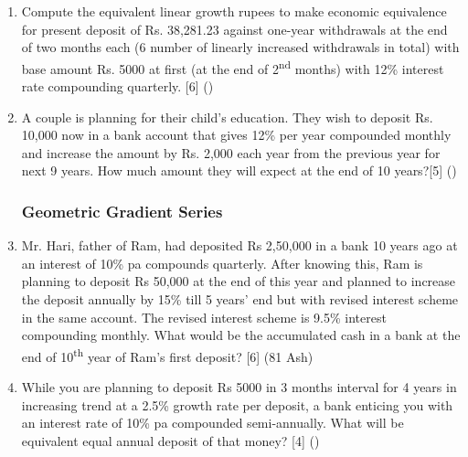 \documentclass[12pt]{article}
\newcommand{\super}[1]{\textsuperscript{#1}}
\begin{document}
\begin{enumerate}[noitemsep, topsep=0pt]
			\item Compute the equivalent linear growth rupees to make economic equivalence for present deposit of Rs. 38,281.23 against one-year withdrawals at the end of two months each (6 number of linearly increased withdrawals in total) with base amount Rs. 5000 at first (at the end of 2\textsuperscript{nd} months) with 12\% interest rate compounding quarterly. \hfill[6] ()

			\item A couple is planning for their child's education. They wish to deposit Rs. 10,000 now in a bank account that gives 12\% per year compounded monthly and increase the amount by Rs. 2,000 each year from the previous year for next 9 years. How much amount they will expect at the end of 10 years?\hfill[5] ()
	
		\subsubsection{Geometric Gradient Series}
		
			\item Mr. Hari, father of Ram, had deposited Rs 2,50,000 in a bank 10 years ago at an interest of 10\% pa compounds quarterly. After knowing this, Ram is planning to deposit Rs 50,000 at the end of this year and planned to increase the deposit annually by 15\% till 5 years' end but with revised interest scheme in the same account. The revised interest scheme is 9.5\% interest compounding monthly. What would be the accumulated cash in a bank at the end of 10\super{th} year of Ram's first deposit? \hfill[6] (81 Ash)

			\item While you are planning to deposit Rs 5000 in 3 months interval for 4 years in increasing trend at a 2.5\% growth rate per deposit, a bank enticing you with an interest rate of 10\% pa compounded semi-annually. What will be equivalent equal annual deposit of that money? \hfill[4] ()
	\end{enumerate}

\pagebreak
\end{document}
